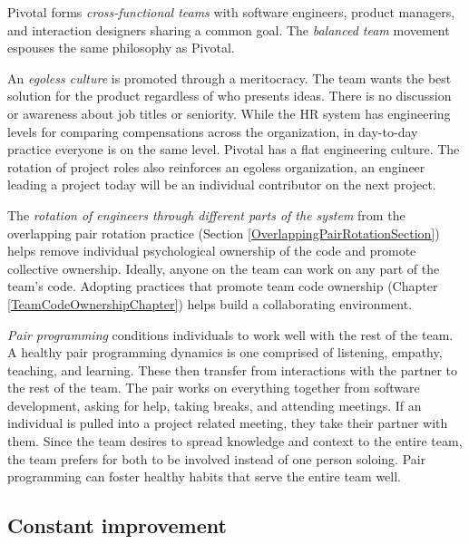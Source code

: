Pivotal forms \textit{cross-functional teams} with software engineers, product managers, and interaction designers sharing a common goal. The \textit{balanced team} movement espouses the same philosophy as Pivotal.


An \textit{egoless culture} is promoted through a meritocracy. The team wants the best solution for the product regardless of who presents ideas. There is no discussion or awareness about job titles or seniority. While the HR system has engineering levels for comparing compensations across the organization, in day-to-day practice everyone is on the same level. Pivotal has a flat engineering culture. The rotation of project roles also reinforces an egoless organization, an engineer leading a project today will be an individual contributor on the next project. 


The \textit{rotation of engineers through different parts of the system} from the overlapping pair rotation practice (Section \ref{OverlappingPairRotationSection}) helps remove individual psychological ownership of the code and promote collective ownership. Ideally, anyone on the team can work on any part of the team’s code. Adopting practices that promote team code ownership (Chapter \ref{TeamCodeOwnershipChapter}) helps build a collaborating environment.


\textit{Pair programming} conditions individuals to work well with the rest of the team. A healthy pair programming dynamics is one comprised of listening, empathy, teaching, and learning. These then transfer from interactions with the partner to the rest of the team. The pair works on everything together from software development, asking for help, taking breaks, and attending meetings. If an individual is pulled into a project related meeting, they take their partner with them. Since the team desires to spread knowledge and context to the entire team, the team prefers for both to be involved instead of one person soloing. Pair programming can foster healthy habits that serve the entire team well.


\subsection{Constant improvement}



